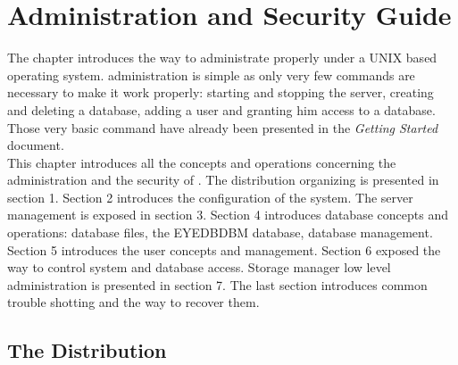 

\newcommand{\mantitle}{\textsc{Administration}}


\tableofcontents

\chapter*{Administration and Security Guide}

The chapter introduces the way to administrate properly \eyedb under
a UNIX based operating system.
\eyedb administration is simple as only very few commands are necessary to
make it work properly: starting and stopping the server, creating and deleting
a database, adding a user and granting him access to a database.
Those very basic command have already been presented in the
\emph{Getting Started} document.
\\
This chapter introduces all the concepts and operations concerning
the administration and the security of \eyedbX.
The distribution organizing is presented in section 1. Section 2
introduces the configuration of the system.
The server management is exposed in section 3.
Section 4 introduces database concepts and operations:
database files, the EYEDBDBM database, database management.
Section 5 introduces the \eyedb user concepts and management.
Section 6 exposed the way to control system and database access.
Storage manager low level administration is presented in section 7.
The last section introduces common trouble shotting and the
way to recover them.

\newcommand{\tdir}{\emph{topdir}}
\newcommand{\constvar}{The value of this variable cannot be changed}
\newcommand{\modvar}{The value of this variable can be modified}
\newcommand{\esc}[1]{\ttv{$\backslash$#1}}

\section{The Distribution}
